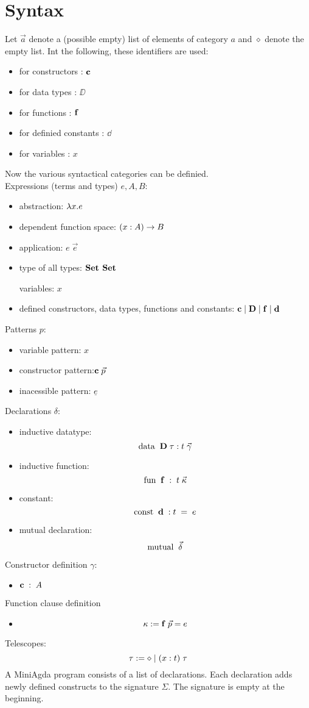 \section{Syntax}
Let $\vec{a}$ denote a (possible empty) list of elements of category $a$
and $\diamond$ denote the empty list.
Int the following, these identifiers are used:
\begin{itemize}
\item for constructors : $\mathbf{c}$ 
\item for data types : $\DD$
\item for functions : $\mathbf{f}$
\item for definied constants : $\dd$
\item for variables : $x$
\end{itemize}
Now the various syntactical categories can be definied.
\\
Expressions (terms and types) $e,A,B$:  
\begin{itemize}
\item
abstraction: $ \lambda x . e $ 
\item
dependent function space: $( x : A ) \rightarrow B$ 
\item 
application: $ e \; \vec{e} $ 
\item
type of all types: $ \mathbf{Set} $  $ \mathbf{Set} $ 

variables: $x$
\item
defined constructors, data types, functions and constants:
$ \mathbf{c} \;\vert\; \mathbf{D} \;\vert\; \mathbf{f} \;\vert\; \mathbf{d}$
\end{itemize}
Patterns $p$:
\begin{itemize}
\item
variable pattern: $x$ 
\item
constructor pattern:$ \mathbf{c} \; \vec{p} $ 
\item
inacessible pattern: $ \underline{e} $ 
\end{itemize}
Declarations $\delta$:
\begin{itemize}
\item
inductive datatype: 
\[\mathrm{data}\; \; \mathbf{D} \; \tau : t \; \vec{\gamma}\]  
\item
inductive function:
\[\mathrm{fun}\; \; \mathbf{f} \; : \; t \; \vec{\kappa}\]
\item
constant:
\[\mathrm{const}\; \;  \mathbf{d} \; : t \; = \; e \]
\item
mutual declaration:
\[\mathrm{mutual}\; \; \vec{\delta}\]
\end{itemize}
Constructor definition $\gamma$:
\begin{itemize}
\item
$ \mathbf{c} \; : \; A $ 
\end{itemize}
Function clause definition
\begin{itemize}
\item
\[ \kappa :=  \mathbf{f} \; \vec{p} = e \]
\end{itemize}
Telescopes:
\[ \tau := \diamond \;\vert\; ( x : t ) \; \tau \]
A MiniAgda program consists of a list of declarations.
Each declaration adds newly defined constructs to the signature $\Sigma$.
The signature is empty at the beginning.
